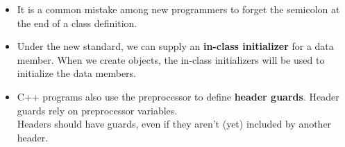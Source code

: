 \begin{itemize}
\item It is a common mistake among new programmers to forget the semicolon at the end of a class definition.

\item Under the new standard, we can supply an \textbf{in-class initializer} for a data member. When we create objects, the in-class initializers will be used to initialize the data members.

\item C++ programs also use the preprocessor to define \textbf{header guards}. Header guards rely on preprocessor variables.\\Headers should have guards, even if they aren't (yet) included by another header.

\end{itemize}